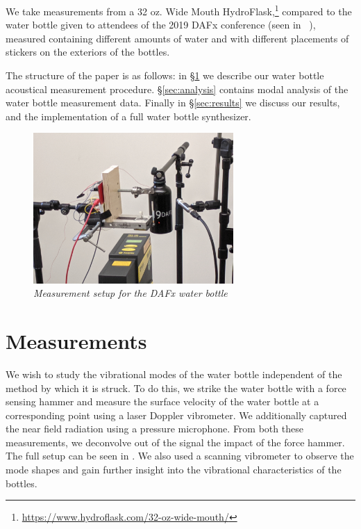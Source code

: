 \documentclass[twoside,a4paper]{article}
\begin{document}

We take measurements from a 32 oz. Wide Mouth
HydroFlask,\footnote{\url{https://www.hydroflask.com/32-oz-wide-mouth/}}
compared to the water bottle given to attendees of the 2019 DAFx
conference (seen in ~), measured containing different amounts of water and with different placements of stickers on the exteriors of the
bottles.

The structure of the paper is as follows: in \S\ref{sec:measure} we describe
our water bottle acoustical measurement procedure. \S\ref{sec:analysis}
contains modal analysis of the water bottle measurement data.
Finally in \S\ref{sec:results} we discuss our results, and the
implementation of a full water bottle synthesizer.


\begin{figure}[!t]
    \centering
    \includegraphics[width=3in]{Figures/dafx_measure}
    \caption{\it{Measurement setup for the DAFx water bottle}}
    \label{fig:dafx_measure}
\end{figure}

\section{Measurements} \label{sec:measure}
%
We wish to study the vibrational modes of the water bottle independent of the method by which it is struck. To do this, we strike the water bottle with a force sensing hammer and measure the surface velocity of the water bottle at a corresponding point using a laser Doppler vibrometer. We additionally captured the near field radiation using a pressure microphone. From both these measurements, we deconvolve out of the signal the impact of the force hammer. The full setup can be seen in . We also used a scanning vibrometer to observe the mode shapes and gain further insight into the vibrational characteristics of the bottles. 
\end{document}
